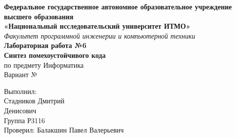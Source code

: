\textbf{Федеральное государственное автономное образовательное учреждение высшего образования}\\[0.5em]
\noindent\textbf{«Национальный исследовательский университет ИТМО»}\\[2em]

\textit{Факультет программной инженерии и компьютерной техники}\\[8em]

\textbf{Лабораторная работа №6}\\[0.5em]
\textbf{Синтез помехоустойчивого кода}\\[0.5em]
по предмету Информатика\\[0.5em]
Вариант №\\[30em]

\begin{flushright}
Выполнил:\\
Стадников Дмитрий\\
Денисович\\
Группа Р3116\\[1em]
Проверил: Балакшин Павел Валерьевич\\
\end{flushright}
